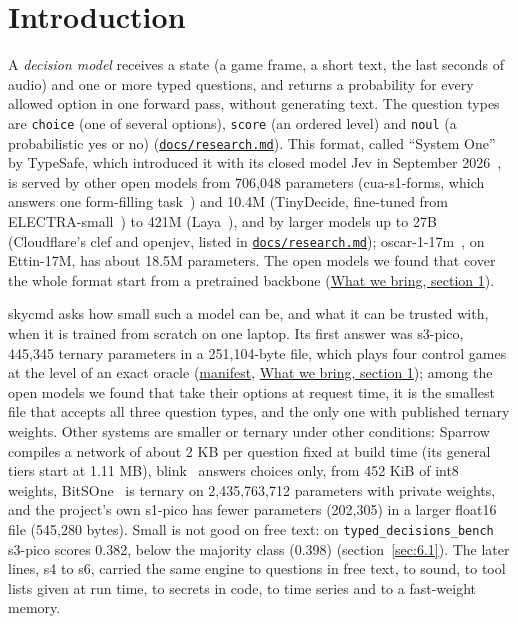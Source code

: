 \documentclass[10pt]{article}
\begin{document}
\section{Introduction}\label{sec:1}

A \emph{decision model} receives a state (a game frame, a short text, the last seconds of audio) and one or more typed questions, and returns a probability for every allowed option in one forward pass, without generating text. The question types are \texttt{choice} (one of several options), \texttt{score} (an ordered level) and \texttt{noul} (a probabilistic yes or no) (\href{https://github.com/maxgfr/skycmd/blob/main/docs/research.md}{\texttt{docs/\allowbreak{}research.md}}). This format, called ``System One'' by TypeSafe, which introduced it with its closed model Jev in September 2026~\cite{jev}, is served by other open models from 706,048 parameters (cua-s1-forms, which answers one form-filling task~\cite{cua}) and 10.4M (TinyDecide, fine-tuned from ELECTRA-small~\cite{tinydecide}) to 421M (Laya~\cite{laya}), and by larger models up to 27B (Cloudflare's clef and openjev, listed in \href{https://github.com/maxgfr/skycmd/blob/main/docs/research.md}{\texttt{docs/\allowbreak{}research.md}}); oscar-1-17m~\cite{oscar}, on Ettin-17M, has about 18.5M parameters. The open models we found that cover the whole format start from a pretrained backbone (\href{https://maxgfr.github.io/skycmd/novelty/\#_1-a-decision-model-in-251-kb}{What we bring, section 1}).

skycmd asks how small such a model can be, and what it can be trusted with, when it is trained from scratch on one laptop. Its first answer was s3-pico, 445,345 ternary parameters in a 251,104-byte file, which plays four control games at the level of an exact oracle (\href{https://maxgfr.github.io/skycmd/models/manifest.json}{manifest}, \href{https://maxgfr.github.io/skycmd/novelty/\#_1-a-decision-model-in-251-kb}{What we bring, section 1}); among the open models we found that take their options at request time, it is the smallest file that accepts all three question types, and the only one with published ternary weights. Other systems are smaller or ternary under other conditions: Sparrow~\cite{sparrow} compiles a network of about 2 KB per question fixed at build time (its general tiers start at 1.11 MB), blink~\cite{blink} answers choices only, from 452 KiB of int8 weights, BitSOne~\cite{bitsone} is ternary on 2,435,763,712 parameters with private weights, and the project's own s1-pico has fewer parameters (202,305) in a larger float16 file (545,280 bytes). Small is not good on free text: on \texttt{typed\_\allowbreak{}decisions\_\allowbreak{}bench} s3-pico scores 0.382, below the majority class (0.398) (section~\ref{sec:6.1}). The later lines, s4 to s6, carried the same engine to questions in free text, to sound, to tool lists given at run time, to secrets in code, to time series and to a fast-weight memory.
\end{document}

